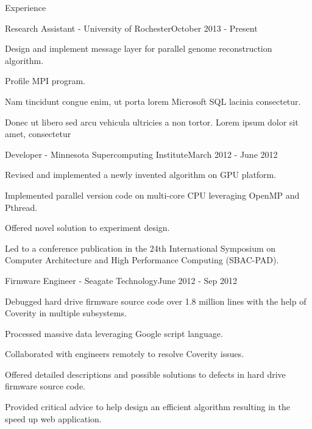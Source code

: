 \documentclass{resume} %
\begin{document}
\begin{rSection}{Experience}

\begin{rSubsection}{Research Assistant - University of Rochester}{October 2013 - Present}{}{}
\item Design and implement message layer for parallel genome reconstruction algorithm.
\item Profile MPI program.
\item Nam tincidunt congue enim, ut porta lorem Microsoft SQL lacinia consectetur.
\item Donec ut libero sed arcu vehicula ultricies a non tortor. Lorem ipsum dolor sit amet, consectetur 
\end{rSubsection}


\begin{rSubsection}{Developer - Minnesota Supercomputing Institute}{March 2012 - June 2012}{}{}
\item Revised and implemented a newly invented algorithm on GPU platform.
\item Implemented parallel version code on multi-core CPU leveraging OpenMP and Pthread.
\item Offered novel solution to experiment design.
\item Led to a conference publication in the 24th International Symposium on Computer Architecture and High Performance Computing (SBAC-PAD).
\end{rSubsection}


\begin{rSubsection}{Firmware Engineer - Seagate Technology}{June 2012 - Sep 2012}{}{}
\item Debugged hard drive firmware source code over 1.8 million lines with the help of Coverity in multiple subsystems.
\item Processed massive data leveraging Google script language.
\item Collaborated with engineers remotely to resolve Coverity issues.
\item Offered detailed descriptions and possible solutions to defects in hard drive firmware source code.
\item Provided critical advice to help design an efficient algorithm resulting in the speed up web application.
\end{rSubsection}

\end{rSection}
\end{document}
